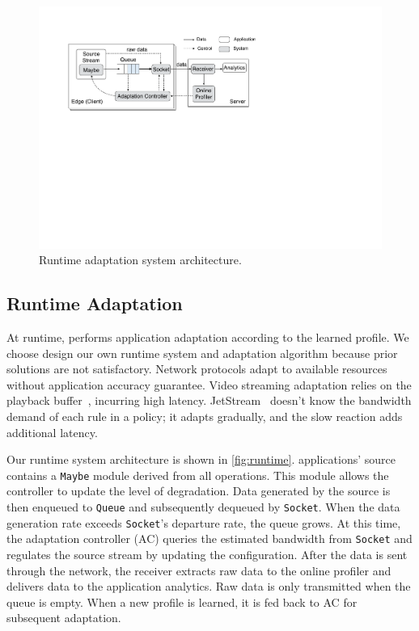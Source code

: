 \begin{figure}
  \centering
  \includegraphics[width=\linewidth]{figures/runtime-adaptation.pdf}
  \caption{Runtime adaptation system architecture.}
  \label{fig:runtime}
\end{figure}

\subsection{Runtime Adaptation}
\label{sec:runtime}

At runtime, \sysname{} performs application adaptation according to the learned
profile. We choose design our own runtime system and adaptation algorithm
because prior solutions are not satisfactory. Network protocols adapt to
available resources without application accuracy guarantee. Video streaming
adaptation relies on the playback buffer~\cite{huang2014buffer}, incurring high
latency. JetStream~\cite{rabkin2014aggregation} doesn't know the bandwidth
demand of each rule in a policy; it adapts gradually, and the slow reaction adds
additional latency.

Our runtime system architecture is shown in \autoref{fig:runtime}. \sysname{}
applications' source contains a \texttt{Maybe} module derived from all \maybe{}
operations. This module allows the controller to update the level of
degradation. Data generated by the source is then enqueued to \texttt{Queue} and
subsequently dequeued by \texttt{Socket}. When the data generation rate exceeds
\texttt{Socket}'s departure rate, the queue grows. At this time, the adaptation
controller (AC) queries the estimated bandwidth from \texttt{Socket} and
regulates the source stream by updating the configuration.  After the data is
sent through the network, the receiver extracts raw data to the online profiler
and delivers data to the application analytics. Raw data is only transmitted
when the queue is empty. When a new profile is learned, it is fed back to AC for
subsequent adaptation.

